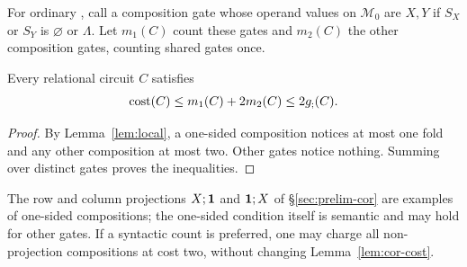 For ordinary \CoR, call a composition gate whose operand values on
$\mathcal M_0$ are $X,Y$  if $S_X$ or $S_Y$ is
$\varnothing$ or $\Lambda$. Let
$m_1(C)$ count these gates and $m_2(C)$ the other composition gates,
counting shared gates once.
\begin{lemma}\label{lem:cor-cost}
Every relational circuit $C$ satisfies
\[
 \operatorname{cost}(C)\le m_1(C)+2m_2(C)\le2g_{;}(C).
\]
\end{lemma}
\begin{proof}
By Lemma~\ref{lem:local}, a one-sided composition notices at most one
fold and any other composition at most two. Other gates notice nothing.
Summing over distinct gates proves the inequalities.
\end{proof}
The row and column projections $X;\mathbf{1}$ and $\mathbf{1};X$ of
\S\ref{sec:prelim-cor} are examples of one-sided compositions; the
one-sided condition itself is semantic and may hold for other gates.
If a syntactic count is preferred, one may charge all non-projection
compositions at cost two, without changing Lemma~\ref{lem:cor-cost}.

